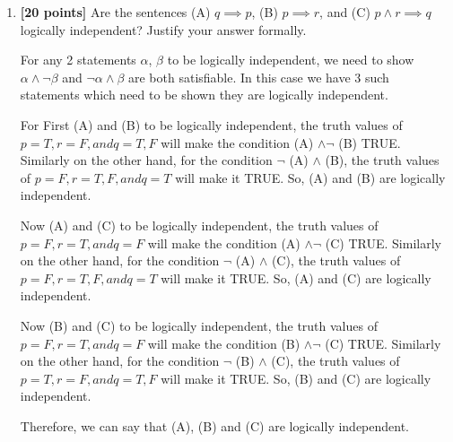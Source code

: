 \documentclass{article}
\begin{document}
\begin{enumerate}
\item \textbf{[20 points]} Are the sentences (A) $q \implies p$, (B)
  $p \implies r$, and (C) $p \land r \implies q$ logically
  independent?  Justify your answer formally.
  
  For any 2 statements $\alpha$, $\beta$ to be logically independent, we need to show $\alpha \land \neg \beta$ and $\neg \alpha \land \beta$ are both satisfiable. In this case we have 3 such statements which need to be shown they are logically independent.
  
  For First (A) and (B) to be logically independent, the truth values of $p=T, r=F, and q=T,F$ will make the condition (A) $\land \neg$ (B) TRUE. Similarly on the other hand, for the condition  $\neg$ (A) $\land$ (B), the truth values of $p=F, r=T,F, and q=T$ will make it TRUE. So, (A) and (B) are logically independent.
  
  Now (A) and (C) to be logically independent, the truth values of $p=F, r=T, and q=F$ will make the condition (A) $\land \neg$ (C) TRUE. Similarly on the other hand, for the condition  $\neg$ (A) $\land$ (C), the truth values of $p=F, r=T,F, and q=T$ will make it TRUE. So, (A) and (C) are logically independent.
  
  Now (B) and (C) to be logically independent, the truth values of $p=F, r=T, and q=F$ will make the condition (B) $\land \neg$ (C) TRUE. Similarly on the other hand, for the condition  $\neg$ (B) $\land$ (C), the truth values of $p=T, r=F, and q=T,F$ will make it TRUE. So, (B) and (C) are logically independent.
  
  Therefore, we can say that (A), (B) and (C) are logically independent.

\end{enumerate}
\end{document}

